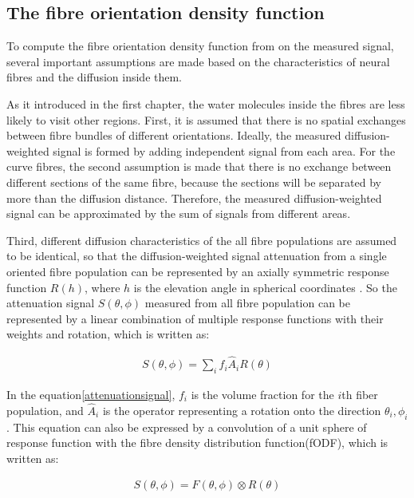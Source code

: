 \subsection{The fibre orientation density function}
To compute the fibre orientation density function from on the measured signal, several important assumptions are made based on the characteristics of neural fibres and the diffusion inside them. 

As it introduced in the first chapter, the water molecules inside the fibres are less likely to visit other regions. First, it is assumed that there is 
no spatial exchanges between fibre bundles of different orientations. Ideally, the measured diffusion-weighted signal is formed by adding
independent signal from each area. For the curve fibres, the second assumption is made that there is no exchange between different sections of the same fibre, because
the sections will be separated by more than the diffusion distance. Therefore, the measured diffusion-weighted signal can be approximated by the sum of signals from 
different areas.

Third, different diffusion characteristics of the all fibre populations are assumed to be identical, so that the diffusion-weighted signal attenuation 
from a single oriented fibre population can be represented by an axially symmetric response function $R(h)$, where $h$ is the elevation angle in spherical coordinates \cite{tournierDirectEstimationFiber2004}. 
So the attenuation signal $S(\theta, \phi)$ measured from all fibre population can be represented by a linear combination of multiple response functions with their weights and rotation, which is written as:

\begin{gather}\label{attenuationsignal}  
    S(\theta, \phi) = \sum_{i}^{}f_{i}\hat{A}_{i}R(\theta)
\end{gather}

In the equation\ref*{attenuationsignal},  $f_{i}$ is the volume fraction for the $i$th fiber population, and $\hat{A}_{i}$ is the operator representing a rotation onto the direction $\theta_{i}, \phi_{i}$ \cite{tournierDirectEstimationFiber2004}.
This equation can also be expressed by a convolution of a unit sphere of response function with the fibre density distribution function(fODF), which is written as:

\begin{gather}\label{convo}  
    S(\theta ,\phi ) = F(\theta ,\phi ) \otimes R(\theta)
\end{gather}

